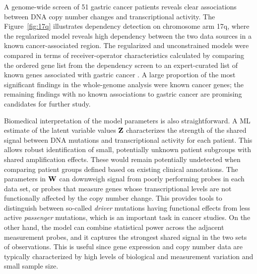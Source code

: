 A genome-wide screen of 51 gastric cancer patients
\citep{Myllykangas08jc} reveals clear associations between DNA copy
number changes and transcriptional activity. The Figure~\ref{fig:17q}
illustrates dependency detection on chromosome arm 17q, where the
regularized model reveals high dependency between the two data sources
in a known cancer-associated region.  The regularized and
unconstrained models were compared in terms of receiver-operator
characteristics calculated by comparing the ordered gene list from the
dependency screen to an expert-curated list of known genes associated
with gastric cancer \citep{Myllykangas08jc}. A large proportion of the
most significant findings in the whole-genome analysis were known
cancer genes; the remaining findings with no known associations to
gastric cancer are promising candidates for further study.

Biomedical interpretation of the model parameters is also
straightforward. A ML estimate of the latent variable values \(\mathbf{Z}\)
characterizes the strength of the shared signal between DNA mutations
and transcriptional activity for each patient. This allows robust
identification of small, potentially unknown patient subgroups with
shared amplification effects. These would remain potentially
undetected when comparing patient groups defined based on existing
clinical annotations. The parameters in \(\mathbf{W}\) can downweigh signal
from poorly performing probes in each data set, or probes that measure
genes whose transcriptional levels are not functionally affected by
the copy number change. This provides tools to distinguish between
so-called {\it driver} mutations having functional effects from less
active {\it passenger} mutations, which is an important task in cancer
studies.  On the other hand, the model can combine statistical power
across the adjacent measurement probes, and it captures the strongest
shared signal in the two sets of observations. This is useful since
gene expression and copy number data are typically characterized by
high levels of biological and measurement variation and small sample
size.

